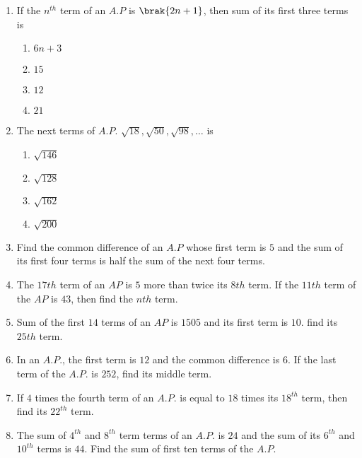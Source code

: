 \begin{enumerate}
\item If the $n^{th}$ term of an $A.P$ is $\brak{2n+1}$, then sum of its first three terms is 
\begin{enumerate}
\item $6n + 3$ 
\item $15$ 
\item $12$ 
\item $21$ 
\end{enumerate}
\item The next terms of $A.P.$ $\sqrt {18}, \sqrt {50}, \sqrt {98}, \ldots$ is 
\begin{enumerate}
\item $\sqrt {146}$ 
\item $\sqrt {128}$ 
\item $\sqrt {162}$ 
\item $\sqrt {200}$ 
\end{enumerate}
\item Find the common difference of an $A.P$ whose first term is $5$ and the sum of its first four terms is half the sum of the next four terms. 
\item The $17th$ term of an $AP$ is $5$ more than twice its $8th$ term. If the $11th$ term of the $AP$ is $43$, then find the $nth$ term. 

\item Sum of the first $14$ terms of an $AP$ is $1505$ and its first term is $10$. find its $25th$ term. 
\item In an $A.P.$, the first term is $12$ and the common difference is $6$. If the last term of the $A.P.$ is $252$, find its middle term. 
\item If $4$ times the fourth term of an $A.P.$ is equal to $18$ times its $18^{th}$ term, then find its $22^{th}$ term. 
\item The sum of $4^{th}$ and $8^{th}$ term terms of an $A.P.$ is $24$ and the sum of its $6^{th}$ and $10^{th}$ terms is $44$. Find the sum of first ten terms of the $A.P.$ 
\end{enumerate}
